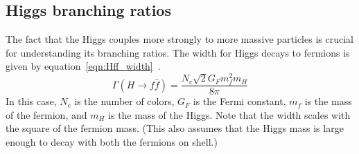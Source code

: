 \subsection{Higgs branching ratios}

The fact that the Higgs couples more strongly to more massive particles is crucial for understanding its branching ratios. The width for Higgs decays to fermions is given by equation~\ref{eqn:Hff_width}~\cite{Tully}.
%
\begin{equation}
\label{eqn:Hff_width}
\Gamma(H\to f\bar{f}) = \frac{N_c \sqrt{2} G_F m_f^2 m_H}{8\pi}
\end{equation}
%
In this case, $N_c$ is the number of colors, $G_F$ is the Fermi constant, $m_f$ is the mass of the fermion, and $m_H$ is the mass of the Higgs. Note that the width scales with the square of the fermion mass. (This also assumes that the Higgs mass is large enough to decay with both the fermions on shell.) 

